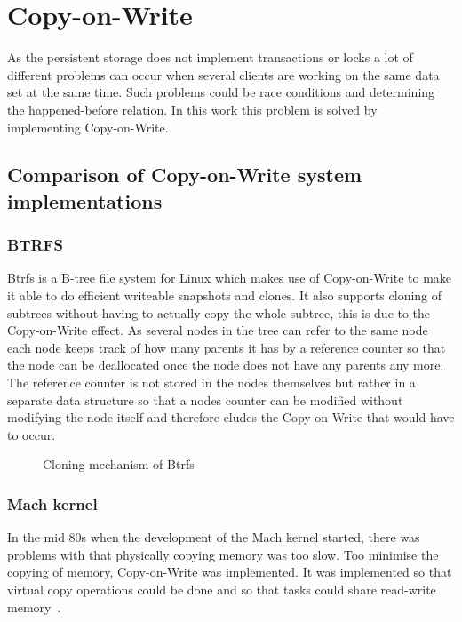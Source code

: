 \documentclass[a4paper,12pt]{article}
\begin{document}
\newpage 
\section{Copy-on-Write}
As the persistent storage does not implement transactions or locks a lot of different problems can occur when several 
clients are working on the same data set at the same time. Such problems could be race conditions and determining the 
happened-before relation. In this work this problem is solved by implementing Copy-on-Write.

\subsection{Comparison of Copy-on-Write system implementations}
\subsubsection{BTRFS}
Btrfs is a B-tree file system for Linux which makes use of Copy-on-Write to make it able to do efficient writeable 
snapshots and clones. It also supports cloning of subtrees without having to actually copy the whole subtree, 
this is due to the Copy-on-Write effect. As several nodes in the tree can refer to the same node each node keeps 
track of how many parents it has by a reference counter so that the node can be deallocated once the node does not 
have any parents any more. The reference counter is not stored in the nodes themselves but rather in a separate data 
structure so that a nodes counter can be modified without modifying the node itself and therefore eludes the 
Copy-on-Write that would have to occur.

\begin{figure}[htp] 
    \caption{Cloning mechanism of Btrfs~\cite{BTRFS}}
    \label{fig:btrfs_tree}
\end{figure}

\subsubsection{Mach kernel}
In the mid 80s when the development of the Mach kernel started, there was problems with that physically copying memory 
was too slow. Too minimise the copying of memory, Copy-on-Write was implemented. It was implemented so that virtual 
copy operations could be done and so that tasks could share read-write memory~\cite{MACH}.
\end{document}
